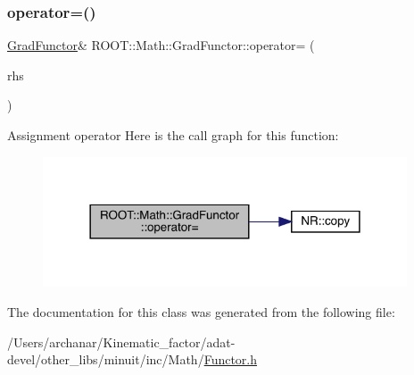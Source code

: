 \subsubsection{\texorpdfstring{operator=()}{operator=()}\hspace{0.1cm}{\footnotesize\ttfamily [3/3]}}
{\footnotesize\ttfamily \mbox{\hyperlink{classROOT_1_1Math_1_1GradFunctor}{Grad\+Functor}}\& R\+O\+O\+T\+::\+Math\+::\+Grad\+Functor\+::operator= (\begin{DoxyParamCaption}\item[{const \mbox{\hyperlink{classROOT_1_1Math_1_1GradFunctor}{Grad\+Functor}} \&}]{rhs }\end{DoxyParamCaption})\hspace{0.3cm}{\ttfamily [inline]}}

Assignment operator Here is the call graph for this function\+:
\nopagebreak
\begin{figure}[H]
\begin{center}
\leavevmode
\includegraphics[width=306pt]{de/d74/classROOT_1_1Math_1_1GradFunctor_a7f7a0c6b466d283cb6085f0e57ab1e6a_cgraph}
\end{center}
\end{figure}


The documentation for this class was generated from the following file\+:\begin{DoxyCompactItemize}
\item 
/\+Users/archanar/\+Kinematic\+\_\+factor/adat-\/devel/other\+\_\+libs/minuit/inc/\+Math/\mbox{\hyperlink{adat-devel_2other__libs_2minuit_2inc_2Math_2Functor_8h}{Functor.\+h}}\end{DoxyCompactItemize}
